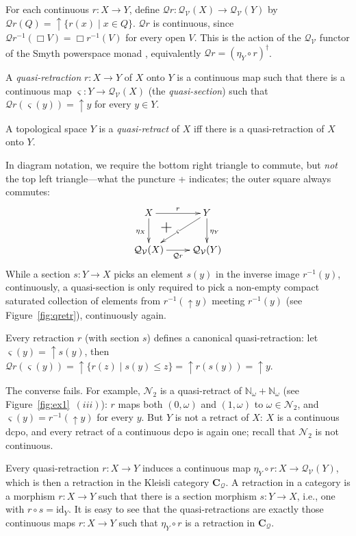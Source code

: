 \documentclass{LMCS}
\newcommand\nat{\mathbb{N}}
\newcommand\Smyth{\mathcal Q}
\newcommand\V{{\mathcal V}}
\newcommand\SV{\Smyth_\V}
\newcommand\upc{\mathop{\uparrow}\nolimits}
\newcommand{\identity}[1]{\mathrm{id}_{#1}}
\newcommand\qs{\varsigma}
\begin{document}
For each continuous $r : X \to Y$, define $\Smyth r : \SV (X) \to \SV
(Y)$ by $\Smyth r (Q) = \upc \{r (x) \mid x \in Q\}$.  $\Smyth r$ is
continuous, since $\Smyth r^{-1} (\Box V) = \Box r^{-1} (V)$ for every
open $V$.  This is the action of the $\SV$ functor of the Smyth
powerspace monad \cite[Chapter~7]{Schalk:PhD}, equivalently $\Smyth r
= {(\eta_Y \circ r)}^\dagger$.

\begin{defi}
  \label{defn:qretr}
  A {\em quasi-retraction\/} $r : X \to Y$ of $X$ onto $Y$ is a
  continuous map such that there is a continuous map $\qs : Y \to\SV
  (X)$ (the {\em quasi-section\/}) such that $\Smyth r (\qs (y)) =
  \upc y$ for every $y \in Y$.

  A topological space $Y$ is a {\em quasi-retract\/} of $X$ iff there
  is a quasi-retraction of $X$ onto $Y$.
\end{defi}
In diagram notation, we require the bottom right triangle to commute,
but \emph{not} the top left triangle---what the puncture {\LARGE+}
indicates; the outer square always commutes:
\begin{equation}
  \label{eq:qretr}
  \xymatrix{
    X \ar[r]^r \ar[d]_{\eta_X} & Y \ar[d]^{\eta_Y} \ar[ld]|{\qs}_(0.6){\text{\LARGE+}} \\
    \SV (X) \ar[r]_{\Smyth r} & \SV (Y)
  }
\end{equation}
While a section $s : Y \to X$ picks an element $s (y)$ in the inverse
image $r^{-1} (y)$, continuously, a quasi-section is only required to
pick a non-empty compact saturated collection of elements from $r^{-1}
(\upc y)$ meeting $r^{-1} (y)$ (see Figure~\ref{fig:qretr}),
continuously again.

Every retraction $r$ (with section $s$) defines a canonical
quasi-retraction: let $\qs (y) = \upc s (y)$, then $\Smyth r (\qs (y))
= \upc \{r (z) \mid s (y) \leq z\} = \upc r (s (y)) = \upc y$.

The converse fails.  For example, $\mathcal N_2$ is a quasi-retract of
$\nat_\omega + \nat_\omega$ (see Figure~\ref{fig:ex1}~$(iii)$): $r$
maps both $(0,\omega)$ and $(1,\omega)$ to $\omega \in \mathcal N_2$,
and $\qs (y) = r^{-1} (\upc y)$ for every $y$.  But $Y$ is not a
retract of $X$: $X$ is a continuous dcpo, and every retract of a
continuous dcpo is again one; recall that $\mathcal N_2$ is not
continuous.

Every quasi-retraction $r : X \to Y$ induces a continuous map $\eta_Y
\circ r : X \to \SV (Y)$, which is then a retraction in the Kleisli
category $\pmb{C}_{\Smyth}$.  A retraction in a category is a morphism
$r : X \to Y$ such that there is a section morphism $s : Y \to X$,
i.e., one with $r \circ s = \identity Y$.  It is easy to see that the
quasi-retractions are exactly those continuous maps $r : X \to Y$ such
that $\eta_Y \circ r$ is a retraction in $\pmb{C}_{\Smyth}$.
\end{document}
